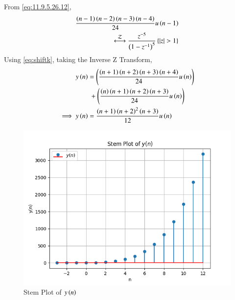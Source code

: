 \documentclass[journal,12pt,twocolumn]{IEEEtran}
\theoremstyle{remark}
\begin{document}
From \eqref{eq:11.9.5.26.12},
\begin{align}
    \frac{\brak{n-1}\brak{n-2}\brak{n-3}\brak{n-4}}{24}u\brak{n-1}\notag\\\system{Z}\frac{z^{-5}}{\brak{1-z^{-1}}^5}\cbrak{\abs{z}>1}
\end{align}
Using \eqref{eq:shiftk}, taking the Inverse Z Transform,
\begin{align}
    y\left(n\right)&=\left(\frac{\left(n+1\right)\left(n+2\right)\left(n+3\right)\left(n+4\right)}{24}u\left(n\right)\right)\notag\\
    &\;+\left(\frac{\left(n\right)\left(n+1\right)\left(n+2\right)\left(n+3\right)}{24}u\left(n\right)\right)\\
    \implies y\left(n\right)&=\frac{\left(n+1\right)\left(n+2\right)^2\left(n+3\right)}{12}u\left(n\right)
\end{align}
\begin{figure}[h!]
    \centering
    \includegraphics[width=1\linewidth]{figs/Figure_1.png}
    \caption{Stem Plot of $y\left(n\right)$}
\end{figure}
\end{document}
